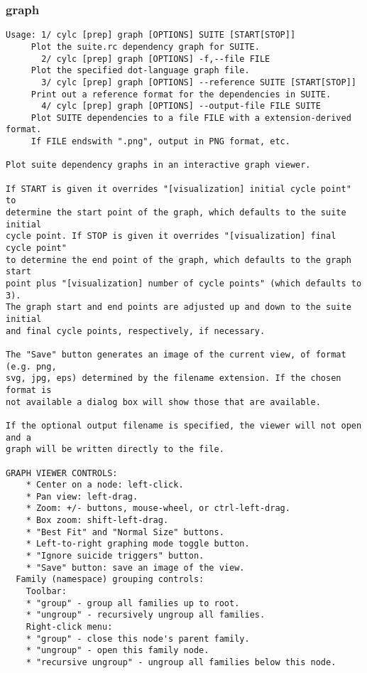 \subsubsection{graph}
\label{graph}
\begin{lstlisting}
Usage: 1/ cylc [prep] graph [OPTIONS] SUITE [START[STOP]]
     Plot the suite.rc dependency graph for SUITE.
       2/ cylc [prep] graph [OPTIONS] -f,--file FILE
     Plot the specified dot-language graph file.
       3/ cylc [prep] graph [OPTIONS] --reference SUITE [START[STOP]]
     Print out a reference format for the dependencies in SUITE.
       4/ cylc [prep] graph [OPTIONS] --output-file FILE SUITE
     Plot SUITE dependencies to a file FILE with a extension-derived format.
     If FILE endswith ".png", output in PNG format, etc.

Plot suite dependency graphs in an interactive graph viewer.

If START is given it overrides "[visualization] initial cycle point" to
determine the start point of the graph, which defaults to the suite initial
cycle point. If STOP is given it overrides "[visualization] final cycle point"
to determine the end point of the graph, which defaults to the graph start
point plus "[visualization] number of cycle points" (which defaults to 3).
The graph start and end points are adjusted up and down to the suite initial
and final cycle points, respectively, if necessary.

The "Save" button generates an image of the current view, of format (e.g. png,
svg, jpg, eps) determined by the filename extension. If the chosen format is
not available a dialog box will show those that are available.

If the optional output filename is specified, the viewer will not open and a
graph will be written directly to the file.

GRAPH VIEWER CONTROLS:
    * Center on a node: left-click.
    * Pan view: left-drag.
    * Zoom: +/- buttons, mouse-wheel, or ctrl-left-drag.
    * Box zoom: shift-left-drag.
    * "Best Fit" and "Normal Size" buttons.
    * Left-to-right graphing mode toggle button.
    * "Ignore suicide triggers" button.
    * "Save" button: save an image of the view.
  Family (namespace) grouping controls:
    Toolbar:
    * "group" - group all families up to root.
    * "ungroup" - recursively ungroup all families.
    Right-click menu:
    * "group" - close this node's parent family.
    * "ungroup" - open this family node.
    * "recursive ungroup" - ungroup all families below this node.


\end{lstlisting}
